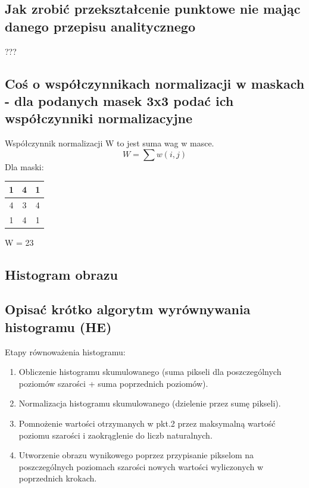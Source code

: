 \documentclass[a4paper, 12pt, titlepage]{article}
\begin{document}
\subsection{Jak zrobić przekształcenie punktowe nie mając danego przepisu analitycznego}
???

\subsection{Coś o współczynnikach normalizacji w maskach - dla podanych masek 3x3 podać ich współczynniki normalizacyjne}
Współczynnik normalizacji W to jest suma wag w masce.
$$ W = \sum w(i,j) $$
Dla maski: 
\begin{tabular}{|c|c|c|}
	\hline
	1 & 4 & 1 \\ \hline
	4 & 3 & 4 \\ \hline
	1 & 4 & 1 \\ \hline
\end{tabular} W = 23 
\pagebreak\subsection{Histogram obrazu}

\subsection{Opisać krótko algorytm wyrównywania histogramu (HE)}
Etapy równoważenia histogramu:
\begin{enumerate}
	\item Obliczenie histogramu skumulowanego (suma pikseli dla poszczególnych poziomów szarości + suma poprzednich poziomów).
	\item Normalizacja histogramu skumulowanego (dzielenie przez sumę pikseli).
	\item Pomnożenie wartości otrzymanych w pkt.2 przez maksymalną wartość poziomu szarości i zaokrąglenie do liczb naturalnych.
	\item Utworzenie obrazu wynikowego poprzez przypisanie pikselom na poszczególnych poziomach szarości nowych wartości wyliczonych w poprzednich krokach.
\end{enumerate}
\end{document}
